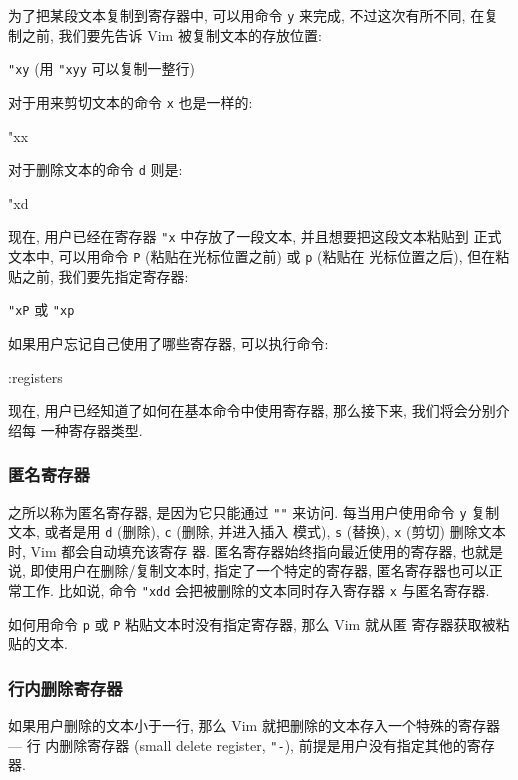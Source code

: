 为了把某段文本复制到寄存器中, 可以用命令 \texttt{y} 来完成, 不过这次有所不同,
在复制之前, 我们要先告诉 Vim 被复制文本的存放位置:
\begin{vimcmdform}
\texttt{"xy} (用 \texttt{"xyy} 可以复制一整行)
\end{vimcmdform}
对于用来剪切文本的命令 \texttt{x} 也是一样的:
\begin{vimcode}
"xx
\end{vimcode}
对于删除文本的命令 \texttt{d} 则是:
\begin{vimcode}
"xd
\end{vimcode}

现在, 用户已经在寄存器 \texttt{"x} 中存放了一段文本, 并且想要把这段文本粘贴到
正式文本中, 可以用命令 \texttt{P} (粘贴在光标位置之前) 或 \texttt{p} (粘贴在 
光标位置之后), 但在粘贴之前, 我们要先指定寄存器:
\begin{vimcmdform}
\texttt{"xP} 或 \texttt{"xp}
\end{vimcmdform}

如果用户忘记自己使用了哪些寄存器, 可以执行命令:
\begin{vimcode}
:registers
\end{vimcode}

现在, 用户已经知道了如何在基本命令中使用寄存器, 那么接下来, 我们将会分别介绍每
一种寄存器类型.

\subsubsection{匿名寄存器}
\label{subsubsec:the_unnamed_register}

之所以称为匿名寄存器, 是因为它只能通过 \texttt{""} 来访问. 每当用户使用命令
\texttt{y} 复制文本, 或者是用 \texttt{d} (删除), \texttt{c} (删除, 并进入插入
模式), \texttt{s} (替换), \texttt{x} (剪切) 删除文本时, Vim 都会自动填充该寄存
器. 匿名寄存器始终指向最近使用的寄存器, 也就是说, 即使用户在删除/复制文本时,
指定了一个特定的寄存器, 匿名寄存器也可以正常工作. 比如说, 命令 \texttt{"xdd}
会把被删除的文本同时存入寄存器 \texttt{x} 与匿名寄存器.

如何用命令 \texttt{p} 或 \texttt{P} 粘贴文本时没有指定寄存器, 那么 Vim 就从匿
寄存器获取被粘贴的文本.

\subsubsection{行内删除寄存器}
\label{subsubsec:the_small_delete_register}

如果用户删除的文本小于一行, 那么 Vim 就把删除的文本存入一个特殊的寄存器 --- 行
内删除寄存器 (small delete register, \texttt{"-}), 前提是用户没有指定其他的寄存
器.

